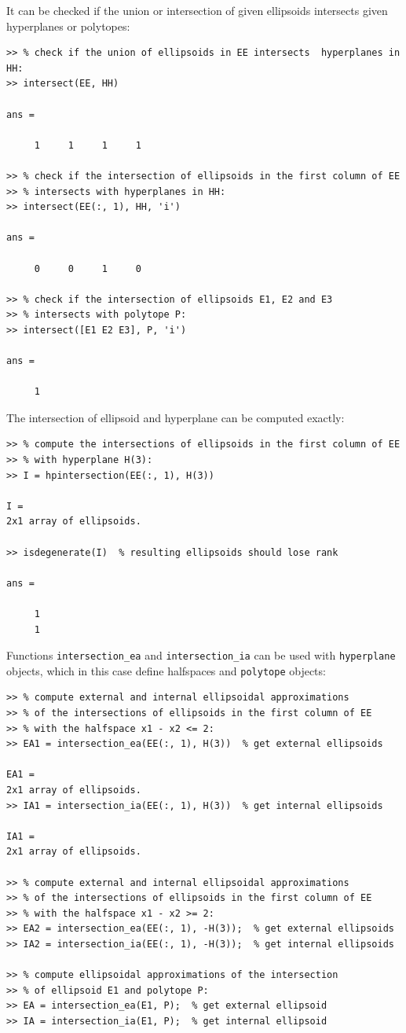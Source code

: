 \documentclass{report}
\begin{document}
It can be checked if the union or intersection of given ellipsoids intersects
given hyperplanes or polytopes:
{\tt \begin{verbatim}
>> % check if the union of ellipsoids in EE intersects  hyperplanes in HH:
>> intersect(EE, HH)

ans =

     1     1     1     1

>> % check if the intersection of ellipsoids in the first column of EE
>> % intersects with hyperplanes in HH:
>> intersect(EE(:, 1), HH, 'i')

ans =

     0     0     1     0

>> % check if the intersection of ellipsoids E1, E2 and E3
>> % intersects with polytope P:
>> intersect([E1 E2 E3], P, 'i')

ans =

     1
\end{verbatim} }
The intersection of ellipsoid and hyperplane can be computed exactly:
{\tt \begin{verbatim}
>> % compute the intersections of ellipsoids in the first column of EE
>> % with hyperplane H(3):
>> I = hpintersection(EE(:, 1), H(3))

I =
2x1 array of ellipsoids.

>> isdegenerate(I)  % resulting ellipsoids should lose rank

ans =

     1
     1
\end{verbatim} }
Functions {\tt intersection\_ea} and {\tt intersection\_ia} can be used
with {\tt hyperplane} objects, which in this case define halfspaces and
{\tt polytope} objects:
{\tt \begin{verbatim}
>> % compute external and internal ellipsoidal approximations
>> % of the intersections of ellipsoids in the first column of EE
>> % with the halfspace x1 - x2 <= 2:
>> EA1 = intersection_ea(EE(:, 1), H(3))  % get external ellipsoids

EA1 =
2x1 array of ellipsoids.
>> IA1 = intersection_ia(EE(:, 1), H(3))  % get internal ellipsoids

IA1 =
2x1 array of ellipsoids.

>> % compute external and internal ellipsoidal approximations
>> % of the intersections of ellipsoids in the first column of EE
>> % with the halfspace x1 - x2 >= 2:
>> EA2 = intersection_ea(EE(:, 1), -H(3));  % get external ellipsoids
>> IA2 = intersection_ia(EE(:, 1), -H(3));  % get internal ellipsoids

>> % compute ellipsoidal approximations of the intersection
>> % of ellipsoid E1 and polytope P:
>> EA = intersection_ea(E1, P);  % get external ellipsoid
>> IA = intersection_ia(E1, P);  % get internal ellipsoid
\end{verbatim} }
\end{document}
